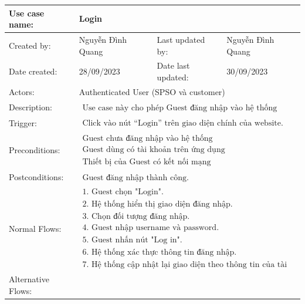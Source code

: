 \begin{tabular}{|l|l|l|l|}
\hline Use case name: & \multicolumn{3}{|l|}{Login} \\
\hline Created by: & Nguyễn Đình Quang & Last updated by: &  Nguyễn Đình Quang \\
\hline Date created: & 28/09/2023 & Date last updated: & 30/09/2023\\
\hline Actors: & \multicolumn{3}{|l|}{ Authenticated User (SPSO và customer) } \\
\hline Description: & \multicolumn{3}{|l|}{$\begin{array}{l}\text{Use case này cho phép Guest đăng nhập vào hệ thống } \end{array}$} \\

\hline Trigger: & \multicolumn{3}{|l|}{$\begin{array}{l}\text{Click vào nút “Login” trên giao diện chính của website.} \end{array}$} \\
\hline Preconditions: & \multicolumn{3}{|l|}{$\begin{array}{l}\text {Guest chưa đăng nhập vào hệ thống} \\ \text{Guest dùng có tài khoản trên ứng dụng} \\ \text{Thiết bị của Guest có kết nối mạng} \end{array}$} \\
\hline Postconditions: & \multicolumn{3}{|l|}{$\begin{array}{l}\text {Guest đăng nhập thành công.} \end{array}$} \\
\hline Normal Flows: & \multicolumn{3}{|l|}{$\begin{array}{l}\text {1. Guest chọn "Login". } \\
\text {2. Hệ thống hiển thị giao diện đăng nhập. } \\
\text {3. Chọn đối tượng đăng nhập. } \\
\text {4. Guest nhập username và password. } \\
\text {5. Guest nhấn nút "Log in".  } \\
\text {6. Hệ thống xác thực thông tin đăng nhập. } \\
\text {7. Hệ thống cập nhật lại giao diện theo thông tin của tài khoản Guest. }\end{array}$} \\
\hline  Alternative Flows: & \multicolumn{3}{|l|}{} \\

\end{tabular}
